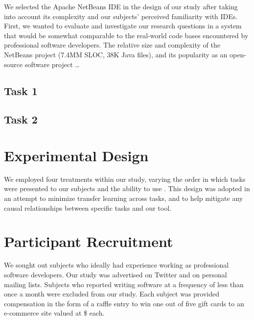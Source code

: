 \par We selected the Apache NetBeans \ac{IDE} in the design of our study after 
taking into account its complexity and our subjects' perceived familiarity with
\acp{IDE}.
First, we wanted to evaluate \toolname{} and investigate our research questions
in a system that would be somewhat comparable to the real-world code bases
encountered by professional software developers.
The relative size and complexity of the NetBeans project (7.4MM SLOC, 38K Java
files), and its popularity as an open-source software project \dots

\subsection{Task 1}
\label{subsec:TaskOne}

\subsection{Task 2}
\label{subsec:TaskTwo}

\section{Experimental Design}
\label{sec:ExperimentalDesign}

We employed four treatments within our study, varying the order in which tasks
were presented to our subjects and the ability to use \toolname{}.
This design was adopted in an attempt to minimize transfer learning across
tasks, and to help mitigate any causal relationships between specific tasks
and our tool. 

\section{Participant Recruitment}
\label{sec:UserStudyRecruitment}

We sought out subjects who ideally had experience working as professional
software developers.
Our study was advertised on Twitter and on personal mailing lists.
Subjects who reported writing software at a frequency of less than once a month 
were excluded from our study.
Each subject was provided compensation in the form of a raffle entry to win
one out of five gift cards to an e-commerce site valued at \$\cardamount{} each.

